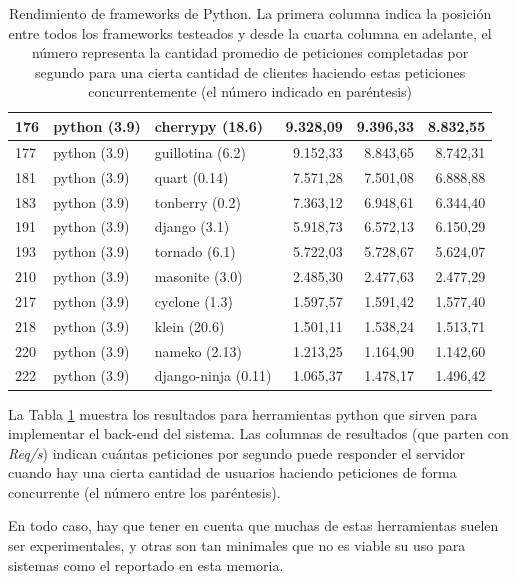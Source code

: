 \begin{table}[!ht]
\begin{center}
\begin{tabular}{|l|l|l|r|r|r|}
            176 & python (3.9) & cherrypy (18.6) & 9.328,09 & 9.396,33 & 8.832,55 \\ \hline
            177 & python (3.9) & guillotina (6.2) & 9.152,33 & 8.843,65 & 8.742,31 \\ \hline
            181 & python (3.9) & quart (0.14) & 7.571,28 & 7.501,08 & 6.888,88 \\ \hline
            183 & python (3.9) & tonberry (0.2) & 7.363,12 & 6.948,61 & 6.344,40 \\ \hline
            191 & python (3.9) & django (3.1) & 5.918,73 & 6.572,13 & 6.150,29 \\ \hline
            193 & python (3.9) & tornado (6.1) & 5.722,03 & 5.728,67 & 5.624,07 \\ \hline
            210 & python (3.9) & masonite (3.0) & 2.485,30 & 2.477,63 & 2.477,29 \\ \hline
            217 & python (3.9) & cyclone (1.3) & 1.597,57 & 1.591,42 & 1.577,40 \\ \hline
            218 & python (3.9) & klein (20.6) & 1.501,11 & 1.538,24 & 1.513,71 \\ \hline
            220 & python (3.9) & nameko (2.13) & 1.213,25 & 1.164,90 & 1.142,60 \\ \hline
            222 & python (3.9) & django-ninja (0.11) & 1.065,37 & 1.478,17 & 1.496,42 \\ \hline
        \end{tabular}
    \end{center}
    \caption{Rendimiento de frameworks de Python. La primera columna indica la posición entre todos los frameworks testeados y desde la cuarta columna en adelante, el número representa la cantidad promedio de peticiones completadas por segundo para una cierta cantidad de clientes haciendo estas peticiones concurrentemente (el número indicado en paréntesis)}
    \label{table:frameworks}
\end{table}

La Tabla \ref{table:frameworks} muestra los resultados para herramientas python
que sirven para implementar el back-end del sistema. Las columnas de resultados
(que parten con \emph{Req/s}) indican cuántas peticiones por segundo puede
responder el servidor cuando hay una cierta cantidad de usuarios haciendo
peticiones de forma concurrente (el número entre los paréntesis).

En todo caso, hay que tener en cuenta que muchas de estas herramientas suelen
ser experimentales, y otras son tan minimales que no es viable su uso para
sistemas como el reportado en esta memoria.

